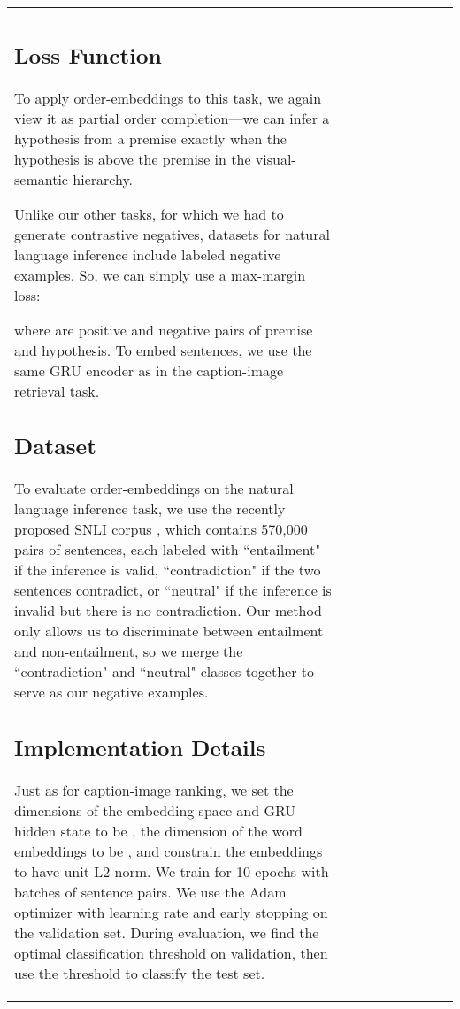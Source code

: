 \documentclass{article} \usepackage{iclr2016_conference,times}
\begin{document}
\begin{table*}[t]
\begin{tabulary}{\linewidth}{L|CCCC|CCCC}
\vspace{-0.5mm}
\subsection{Loss Function}
To apply order-embeddings to this task, we again view it as partial order completion---we can infer a hypothesis from a premise exactly when the hypothesis is above the premise in the visual-semantic hierarchy.

Unlike our other tasks, for which we had to generate contrastive negatives,  datasets for natural language inference include labeled negative examples. So, we can simply use a max-margin loss:

where  are positive and  negative pairs of premise and hypothesis.
To embed sentences, we use the same GRU encoder as in the caption-image retrieval task.

\vspace{-0.5mm}
\subsection{Dataset}


To evaluate order-embeddings on the natural language inference task, we use the recently proposed SNLI corpus \citep{snli}, which contains 570,000 pairs of sentences, each labeled with ``entailment" if the inference is valid, ``contradiction" if the two sentences contradict, or ``neutral" if the inference is invalid but there is no contradiction.
Our method only allows us to discriminate between entailment and non-entailment, so we merge the ``contradiction" and ``neutral" classes together to serve as our negative examples. 

\vspace{-0.5mm}
\subsection{Implementation Details}
Just as for caption-image ranking, we set the dimensions of the embedding space and GRU hidden state to be , the dimension of the word embeddings to be , and constrain the embeddings to have unit L2 norm. We train for 10 epochs with batches of  sentence pairs. We use the Adam optimizer with learning rate  and early stopping on the validation set. 
During evaluation, we find the optimal classification threshold on validation, then use the threshold to classify the test set.

\vspace{-1mm}

\end{tabulary}
\end{table*}
\end{document}
